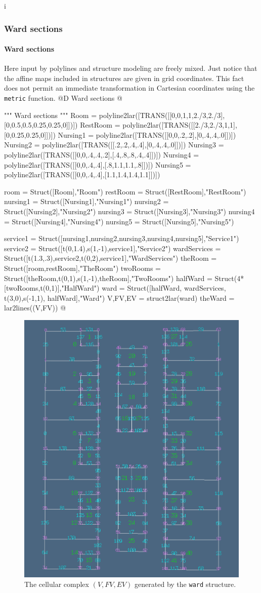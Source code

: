 i\documentclass[11pt,oneside]{article}    %
\begin{document}
\subsubsection{Ward sections}
\paragraph{Ward sections}
Here input by polylines and structure modeling are freely mixed. Just notice that
the affine maps included in structures are given in grid coordinates. This fact 
does not permit an immediate transformation in Cartesian coordinates using the \texttt{metric}
function.
@D Ward sections
@{""" Ward sections """
Room = polyline2lar([TRANS([[0,0,1,1,2./3,2./3],[0,0.5,0.5,0.25,0.25,0]])])
RestRoom = polyline2lar([TRANS([[2./3,2./3,1,1],[0,0.25,0.25,0]])])
Nursing1 = polyline2lar([TRANS([[0,0,.2,.2],[0,.4,.4,.0]])])
Nursing2 = polyline2lar([TRANS([[.2,.2,.4,.4],[0,.4,.4,.0]])])
Nursing3 = polyline2lar([TRANS([[0,0,.4,.4,.2],[.4,.8,.8,.4,.4]])])
Nursing4 = polyline2lar([TRANS([[0,0,.4,.4],[.8,1.1,1.1,.8]])])
Nursing5 = polyline2lar([TRANS([[0,0,.4,.4],[1.1,1.4,1.4,1.1]])])

room = Struct([Room],"Room")
restRoom = Struct([RestRoom],"RestRoom")
nursing1 = Struct([Nursing1],"Nursing1")
nursing2 = Struct([Nursing2],"Nursing2")
nursing3 = Struct([Nursing3],"Nursing3")
nursing4 = Struct([Nursing4],"Nursing4")
nursing5 = Struct([Nursing5],"Nursing5")

service1 = Struct([nursing1,nursing2,nursing3,nursing4,nursing5],"Service1")
service2 = Struct([t(0,1.4),s(1,-1),service1],"Service2")
wardServices = Struct([t(1.3,.3),service2,t(0,2),service1],"WardServices")
theRoom = Struct([room,restRoom],"TheRoom")
twoRooms =  Struct([theRoom,t(0,1),s(1,-1),theRoom],"TwoRooms")
halfWard = Struct(4*[twoRooms,t(0,1)],"HalfWard")
ward = Struct([halfWard, wardServices, t(3,0),s(-1,1), halfWard],"Ward")
V,FV,EV = struct2lar(ward)
theWard = lar2lines((V,FV))
@}

\begin{figure}[htbp] %
   \centering
   \includegraphics[width=0.5\linewidth]{images/ward} 
   \caption{The cellular complex $(V,FV,EV)$ generated by the \texttt{ward} structure.}
   \label{fig:ward}
\end{figure}
\end{document}
